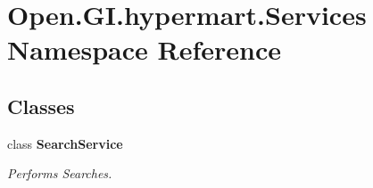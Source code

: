 \section{Open.\+G\+I.\+hypermart.\+Services Namespace Reference}
\label{namespace_open_1_1_g_i_1_1hypermart_1_1_services}
\subsection*{Classes}
\begin{DoxyCompactItemize}
\item 
class \textbf{ Search\+Service}
\begin{DoxyCompactList}\small\item\em Performs Searches. \end{DoxyCompactList}\end{DoxyCompactItemize}
